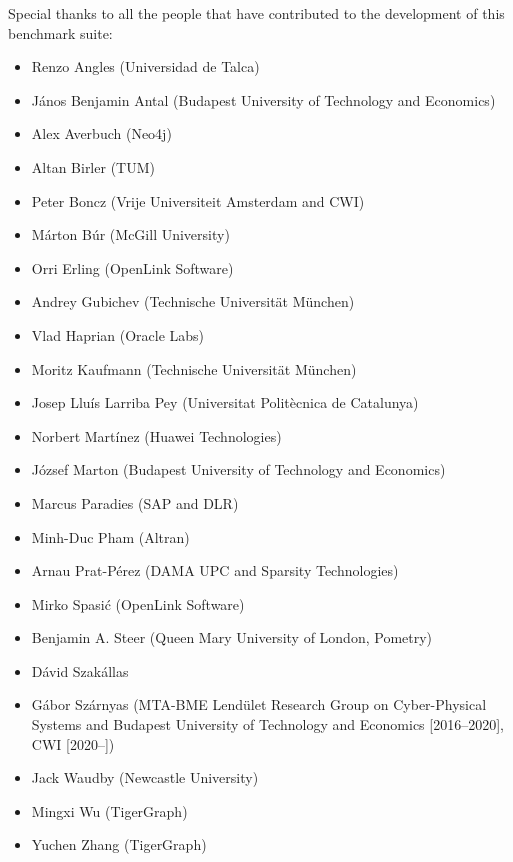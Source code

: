 Special thanks to all the people that have contributed to the development of this benchmark suite:
\begin{itemize}
  \item Renzo Angles (Universidad de Talca)
  \item J\'anos Benjamin Antal (Budapest University of Technology and Economics)
  \item Alex Averbuch (Neo4j)
  \item Altan Birler (TUM)
  \item Peter Boncz (Vrije Universiteit Amsterdam and CWI)
  \item M\'arton B\'ur (McGill University)
  \item Orri Erling (OpenLink Software)
  \item Andrey Gubichev (Technische Universit\"at M\"unchen)
  \item Vlad Haprian (Oracle Labs)
  \item Moritz Kaufmann (Technische Universit\"at M\"unchen)
  \item Josep Llu\'is Larriba Pey (Universitat Polit\`ecnica de Catalunya)
  \item Norbert Mart\'inez (Huawei Technologies)
  \item J\'ozsef Marton (Budapest University of Technology and Economics)
  \item Marcus Paradies (SAP and DLR)
  \item Minh-Duc Pham (Altran)
  \item Arnau Prat-P\'erez (DAMA UPC and Sparsity Technologies)
  \item Mirko Spasi\'c (OpenLink Software)
  \item Benjamin A. Steer (Queen Mary University of London, Pometry)
  \item D\'avid Szak\'allas
  \item G\'abor Sz\'arnyas (MTA-BME Lend\"ulet Research Group on Cyber-Physical Systems and Budapest University of Technology and Economics [2016--2020], CWI [2020--])
  \item Jack Waudby (Newcastle University)
  \item Mingxi Wu (TigerGraph)
  \item Yuchen Zhang (TigerGraph)
\end{itemize}
